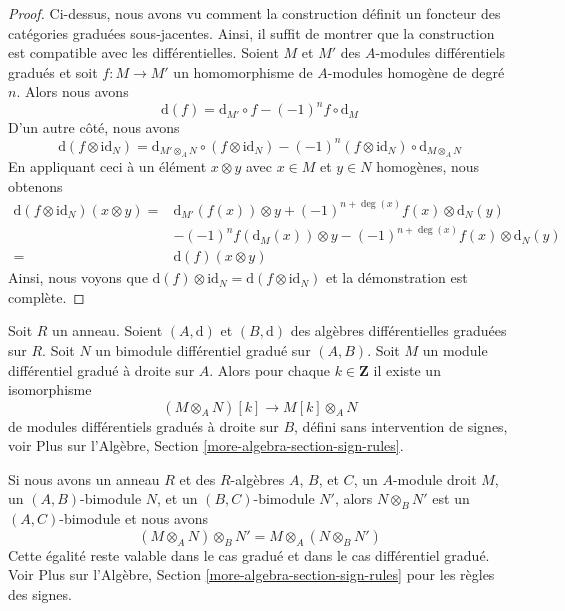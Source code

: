 \begin{proof}
Ci-dessus, nous avons vu comment la construction définit un foncteur des
catégories graduées sous-jacentes. Ainsi, il suffit de montrer que la construction
est compatible avec les différentielles. Soient $M$ et $M'$ des $A$-modules
différentiels gradués et soit $f : M \to M'$ un homomorphisme de $A$-modules
homogène de degré $n$. Alors nous avons
$$
\text{d}(f) = \text{d}_{M'} \circ f - (-1)^n f \circ \text{d}_M
$$
D'un autre côté, nous avons
$$
\text{d}(f \otimes \text{id}_N) =
\text{d}_{M' \otimes_A N} \circ
(f \otimes \text{id}_N)
- (-1)^n
(f \otimes \text{id}_N) \circ \text{d}_{M \otimes_A N}
$$
En appliquant ceci à un élément $x \otimes y$ avec $x \in M$ et $y \in N$
homogènes, nous obtenons
\begin{align*}
\text{d}(f \otimes \text{id}_N)(x \otimes y)
= &
\text{d}_{M'}(f(x)) \otimes y + (-1)^{n + \deg(x)}f(x) \otimes \text{d}_N(y) \\
& - (-1)^n f(\text{d}_M(x)) \otimes y
- (-1)^{n + \deg(x)}f(x) \otimes \text{d}_N(y) \\
= &
\text{d}(f) (x \otimes y)
\end{align*}
Ainsi, nous voyons que $\text{d}(f) \otimes \text{id}_N = \text{d}(f \otimes
\text{id}_N)$ et la démonstration est complète.
\end{proof}

\begin{remark}
\label{remark-shift-tensor-no-sign}
Soit $R$ un anneau. Soient $(A, \text{d})$ et $(B, \text{d})$ des algèbres
différentielles graduées sur $R$. Soit $N$ un bimodule différentiel gradué sur
$(A, B)$. Soit $M$ un module différentiel gradué à droite sur $A$. Alors pour
chaque $k \in \mathbf{Z}$ il existe un isomorphisme
$$
(M \otimes_A N)[k] \longrightarrow
M[k] \otimes_A N
$$
de modules différentiels gradués à droite sur $B$, défini sans intervention de
signes, voir Plus sur l'Algèbre, Section \ref{more-algebra-section-sign-rules}.
\end{remark}

\noindent
Si nous avons un anneau $R$ et des $R$-algèbres $A$, $B$, et $C$, un $A$-module
droit $M$, un $(A, B)$-bimodule $N$, et un $(B, C)$-bimodule $N'$, alors $N
\otimes_B N'$ est un $(A, C)$-bimodule et nous avons
$$
(M \otimes_A N) \otimes_B N' = M \otimes_A (N \otimes_B N')
$$
Cette égalité reste valable dans le cas gradué et dans le cas différentiel
gradué. Voir Plus sur l'Algèbre, Section \ref{more-algebra-section-sign-rules}
pour les règles des signes.






